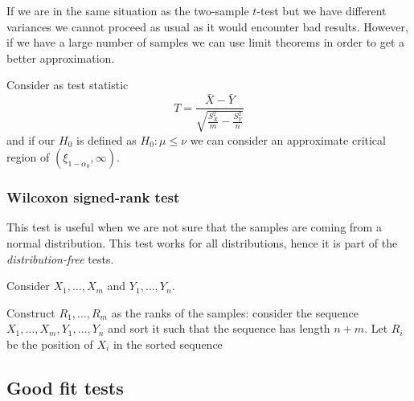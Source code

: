 \documentclass[12pt]{extarticle}
\begin{document}
If we are in the same situation as the two-sample $t$-test but we have different variances
we cannot proceed as usual as it would encounter bad results.
However, if we have a large number of samples we can use limit theorems in order to get a better approximation.

Consider as test statistic
\begin{equation}
    T = \frac{\bar X - \bar Y}{\sqrt{\frac{S_X^2}{m} - \frac{S_Y^2}{n}}}
\end{equation}
and if our $H_0$ is defined as $H_0 : \mu \leq \nu$
we can consider an approximate critical region of $(\xi_{1-\alpha_0}, \infty)$.

\subsubsection{Wilcoxon signed-rank test}

This test is useful when we are not sure that the samples are coming from a normal distribution.
This test works for all distributions, hence it is part of the \emph{distribution-free} tests.

Consider $X_1, \dots, X_m$ and $Y_1, \dots, Y_n$.

Construct $R_1, \dots, R_{m}$ as the ranks of the samples:
consider the sequence $X_1, \dots, X_m, Y_1, \dots, Y_n$ and sort it such that the sequence has length $n+m$.
Let $R_i$ be the position of $X_i$ in the sorted sequence

\subsection{Good fit tests}
\end{document}
